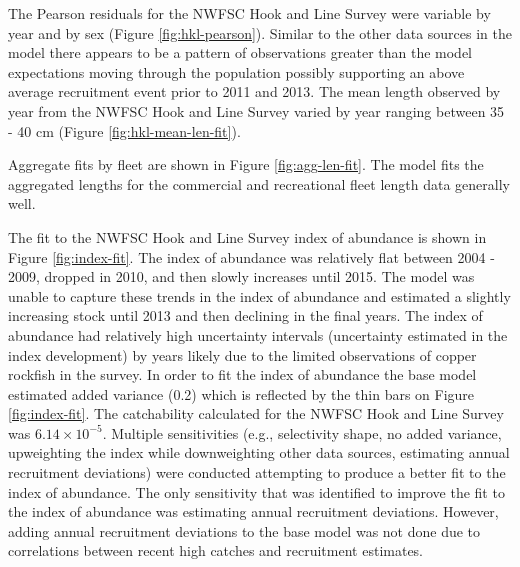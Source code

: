 \documentclass[11pt,
  english,
  a4paper,
]{article}
\begin{document}
\leavevmode\tagmcend\tagstructend\par


The Pearson residuals for the NWFSC Hook and Line Survey were variable by year and by sex (Figure \ref{fig:hkl-pearson}). Similar to the other data sources in the model there appears to be a pattern of observations greater than the model expectations moving through the population possibly supporting an above average recruitment event prior to 2011 and 2013. The mean length observed by year from the NWFSC Hook and Line Survey varied by year ranging between 35 - 40 cm (Figure \ref{fig:hkl-mean-len-fit}).

\leavevmode\tagmcend\tagstructend\par


Aggregate fits by fleet are shown in Figure \ref{fig:agg-len-fit}. The model fits the aggregated lengths for the commercial and recreational fleet length data generally well.

\leavevmode\tagmcend\tagstructend\par


The fit to the NWFSC Hook and Line Survey index of abundance is shown in Figure \ref{fig:index-fit}. The index of abundance was relatively flat between 2004 - 2009, dropped in 2010, and then slowly increases until 2015. The model was unable to capture these trends in the index of abundance and estimated a slightly increasing stock until 2013 and then declining in the final years. The index of abundance had relatively high uncertainty intervals (uncertainty estimated in the index development) by years likely due to the limited observations of copper rockfish in the survey. In order to fit the index of abundance the base model estimated added variance (0.2) which is reflected by the thin bars on Figure \ref{fig:index-fit}. The catchability calculated for the NWFSC Hook and Line Survey was \ensuremath{6.14\times 10^{-5}}. Multiple sensitivities (e.g., selectivity shape, no added variance, upweighting the index while downweighting other data sources, estimating annual recruitment deviations) were conducted attempting to produce a better fit to the index of abundance. The only sensitivity that was identified to improve the fit to the index of abundance was estimating annual recruitment deviations. However, adding annual recruitment deviations to the base model was not done due to correlations between recent high catches and recruitment estimates.
\end{document}
